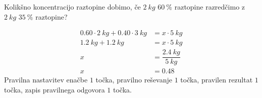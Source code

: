 \documentclass[addpoints]{exam}
\begin{document}
\begin{questions}



        \question[4]
        Kolikšno koncentracijo raztopine dobimo, če $2~kg$ $60~\%$ raztopine razredčimo z $2~kg$ $35~\%$ raztopine?

        \begin{solution}[3cm]
            \begin{align*}
                0.60 \cdot 2~kg + 0.40\cdot 3~kg &= x \cdot 5~kg \\
                                 1.2~kg+1.2~kg &= x\cdot 5~kg \\
                                            x &= \dfrac{2.4~kg}{5~kg} \\
                                            x &= 0.48
            \end{align*}
            Pravilna nastavitev enačbe $1$ točka, pravilno reševanje $1$ točka, pravilen rezultat $1$ točka, zapis pravilnega odgovora $1$ točka.
        \end{solution}




\end{questions}
\end{document}

